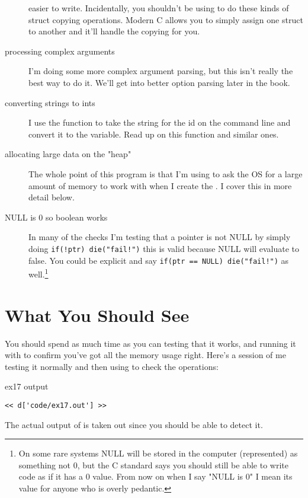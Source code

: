 \begin{description}
    easier to write.  Incidentally, you shouldn't be using  to do
    these kinds of struct copying operations. Modern C allows you to simply assign
    one struct to another and it'll handle the copying for you.
\item [processing complex arguments] I'm doing some more complex argument parsing,
    but this isn't really the best way to do it.  We'll get into better option
    parsing later in the book.
\item [converting strings to ints] I use the  function to take the
    string for the id on the command line and convert it to the 
    variable.  Read up on this function and similar ones.
\item [allocating large data on the "heap"] The whole point of this program is
    that I'm using  to ask the OS for a large amount of memory
    to work with when I create the .  I cover this in more
    detail below.
\item [NULL is 0 so boolean works] In many of the checks I'm testing that a
    pointer is not NULL by simply doing \verb|if(!ptr) die("fail!")| this is
    valid because NULL will evaluate to false.  You could
    be explicit and say \verb|if(ptr == NULL) die("fail!")| as well.\footnote{On some rare systems NULL will
        be stored in the computer (represented) as something not 0, but the C standard says you should still be able to write
            code as if it has a 0 value. From now on when I say "NULL is 0" I mean its value for anyone
            who is overly pedantic.}
\end{description}


\section{What You Should See}

You should spend as much time as you can testing that it works, and running
it with  to confirm you've got all the memory usage
right.  Here's a session of me testing it normally and then using
 to check the operations:

\begin{code}{ex17 output}
\begin{lstlisting}
<< d['code/ex17.out'] >>
\end{lstlisting}
\end{code}

The actual output of  is taken out since you should
be able to detect it.

